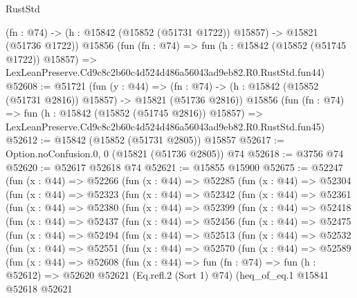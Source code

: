 \begin{lexlean}{RustStd}
\begin{coremodule}
    (fn : @74) -> (h : @15842 (@15852 (@51731 @1722)) @15857) -> @15821 (@51736 @1722))
    @15856
    (fun (fn : @74) =>
    fun (h : @15842 (@15852 (@51745 @1722)) @15857) =>
    LexLeanPreserve.Cd9c8c2b60c4d524d486a56043ad9eb82.R0.RustStd.fun44)
@52608 := @51721
    (fun (y : @44) =>
    (fn : @74) -> (h : @15842 (@15852 (@51731 @2816)) @15857) -> @15821 (@51736 @2816))
    @15856
    (fun (fn : @74) =>
    fun (h : @15842 (@15852 (@51745 @2816)) @15857) =>
    LexLeanPreserve.Cd9c8c2b60c4d524d486a56043ad9eb82.R0.RustStd.fun45)
@52612 := @15842 (@15852 (@51731 @2805)) @15857
@52617 := Option.noConfusion.{0, 0} (@15821 (@51736 @2805)) @74
@52618 := @3756 @74
@52620 := @52617 @52618 @74
@52621 := @15855 @15900
@52675 := @52247
    (fun (x : @44) =>
    @52266
      (fun (x : @44) =>
      @52285
        (fun (x : @44) =>
        @52304
          (fun (x : @44) =>
          @52323
            (fun (x : @44) =>
            @52342
              (fun (x : @44) =>
              @52361
                (fun (x : @44) =>
                @52380
                  (fun (x : @44) =>
                  @52399
                    (fun (x : @44) =>
                    @52418
                      (fun (x : @44) =>
                      @52437
                        (fun (x : @44) =>
                        @52456
                          (fun (x : @44) =>
                          @52475
                            (fun (x : @44) =>
                            @52494
                              (fun (x : @44) =>
                              @52513
                                (fun (x : @44) =>
                                @52532
                                  (fun (x : @44) =>
                                  @52551
                                    (fun (x : @44) =>
                                    @52570
                                      (fun (x : @44) =>
                                      @52589
                                        (fun (x : @44) =>
                                        @52608
                                          (fun (x : @44) =>
                                          fun (fn : @74) =>
                                          fun (h : @52612) =>
                                          @52620
                                            @52621
                                            (Eq.refl.{2} (Sort 1) @74)
                                            (heq_of_eq.{1}
                                              @15841
                                              @52618
                                              @52621

\end{coremodule}
\end{lexlean}
